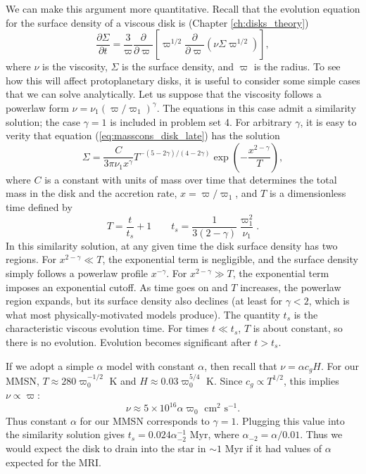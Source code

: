 We can make this argument more quantitative. Recall that the evolution equation for the surface density of a viscous disk is (Chapter \ref{ch:disks_theory})
\begin{equation}
\label{eq:masscons_disk_late}
\frac{\partial \Sigma}{\partial t} = \frac{3}{\varpi} \frac{\partial}{\partial \varpi} \left[\varpi^{1/2} \frac{\partial}{\partial \varpi} (\nu \Sigma \varpi^{1/2})\right],
\end{equation}
where $\nu$ is the viscosity, $\Sigma$ is the surface density, and $\varpi$ is the radius. To see how this will affect protoplanetary disks, it is useful to consider some simple cases that we can solve analytically. Let us suppose that the viscosity follows a powerlaw form $\nu=\nu_1 (\varpi/\varpi_1)^\gamma$. The equations in this case admit a similarity solution; the case $\gamma=1$ is included in problem set 4. For arbitrary $\gamma$, it is easy to verity that equation (\ref{eq:masscons_disk_late}) has the solution
\begin{equation}
\Sigma = \frac{C}{3\pi\nu_1 x^\gamma} T^{-(5-2\gamma)/(4-2\gamma)} \exp\left(-\frac{x^{2-\gamma}}{T}\right),
\end{equation}
where $C$ is a constant with units of mass over time that determines the total mass in the disk and the accretion rate, $x=\varpi/\varpi_1$, and $T$ is a dimensionless time defined by
\begin{equation}
T = \frac{t}{t_s}+1
\qquad
t_s = \frac{1}{3(2-\gamma)} \frac{\varpi_1^2}{\nu_1}.
\end{equation}
In this similarity solution, at any given time the disk surface density has two regions. For $x^{2-\gamma} \ll T$, the exponential term is negligible, and the surface density simply follows a powerlaw profile $x^{-\gamma}$. For $x^{2-\gamma} \gg T$, the exponential term imposes an exponential cutoff. As time goes on and $T$ increases, the powerlaw region expands, but its surface density also declines (at least for $\gamma < 2$, which is what most physically-motivated models produce). The quantity $t_s$ is the characteristic viscous evolution time. For times $t\ll t_s$, $T$ is about constant, so there is no evolution. Evolution becomes significant after $t>t_s$.

If we adopt a simple $\alpha$ model with constant $\alpha$, then recall that $\nu = \alpha c_g H$. For our MMSN, $T \approx 280 \varpi_0^{-1/2}$ K and $H \approx 0.03 \varpi_0^{5/4}$ K. Since $c_g\propto T^{1/2}$, this implies $\nu\propto \varpi$:
\begin{equation}
\nu \approx 5\times 10^{16} \alpha \varpi_0\mbox{ cm}^2\mbox{ s}^{-1}.
\end{equation}
Thus constant $\alpha$ for our MMSN corresponds to $\gamma = 1$. Plugging this value into the similarity solution gives $t_s = 0.024\alpha_{-2}^{-1}\mbox{ Myr}$, where $\alpha_{-2} = \alpha/0.01$. Thus we would expect the disk to drain into the star in $\sim 1$ Myr if it had values of $\alpha$ expected for the MRI.


